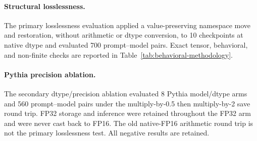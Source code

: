 \paragraph{Structural losslessness.}
The primary losslessness evaluation applied a value-preserving namespace move and restoration, without arithmetic or dtype conversion, to 10 checkpoints at native dtype and evaluated 700 prompt--model pairs. Exact tensor, behavioral, and non-finite checks are reported in Table~\ref{tab:behavioral-methodology}.

\paragraph{Pythia precision ablation.}
The secondary dtype/precision ablation evaluated 8 Pythia model/dtype arms and 560 prompt--model pairs under the multiply-by-0.5 then multiply-by-2 save round trip. FP32 storage and inference were retained throughout the FP32 arm and were never cast back to FP16. The old native-FP16 arithmetic round trip is not the primary losslessness test. All negative results are retained.
